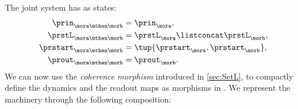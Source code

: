 {    The joint system has as states:
    \begin{equation}
        \label{eq:moore-comp-good-1}
        \begin{aligned}
            \prin_{\mora\mthen\morb}    & = \prin_{\mora}, \\
            \prstL_{\mora\mthen\morb}   & = \prstL_{\mora}\listconcat  \prstL_{\morb}, \\
            \prstart_{\mora\mthen\morb} & = \tup{\prstart_{\mora},\prstart_{\morb}}, \\
            \prout_{\mora\mthen\morb}   & = \prout_{\morb}.
        \end{aligned}
    \end{equation}
    We can now use the \emph{coherence morphism} introduced in \cref{sec:SetL}, to compactly define the dynamics and the readout maps as morphisms in \Set.
    We represent the machinery through the following composition:

    \begin{widepar}
    \end{widepar}


}
